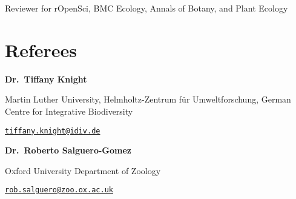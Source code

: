 \documentclass[11pt,]{article}
\begin{document}
Reviewer for rOpenSci, BMC Ecology, Annals of Botany, and Plant Ecology

\hypertarget{referees}{%
\section{Referees}\label{referees}}

\textbf{Dr.~Tiffany Knight}

Martin Luther University, Helmholtz-Zentrum für Umweltforschung, German
Centre for Integrative Biodiversity

\href{mailto:tiffany.knight@idiv.de}{\nolinkurl{tiffany.knight@idiv.de}}

\textbf{Dr.~Roberto Salguero-Gomez}

Oxford University Department of Zoology

\href{mailto:rob.salguero@zoo.ox.ac.uk}{\nolinkurl{rob.salguero@zoo.ox.ac.uk}}
\end{document}
